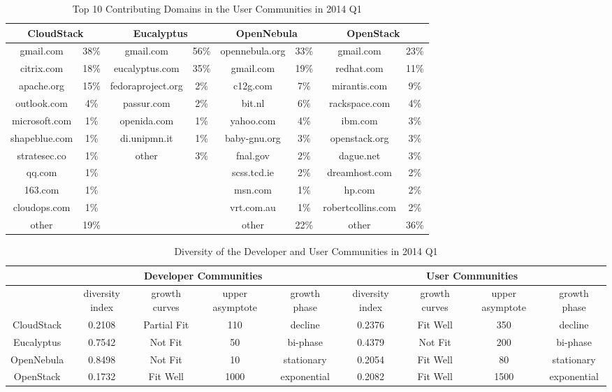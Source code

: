 \documentclass[conference]{IEEEtran}
\begin{document}
\begin{table}[t!]
\caption{Top 10 Contributing Domains in the User Communities in 2014 Q1}
\label{tbl:user}
\centering
\begin{tabular}{|c|c|c|c|c|c|c|c|} \hline
    \multicolumn{2}{|c|}{CloudStack} &
    \multicolumn{2}{|c|}{Eucalyptus} &
    \multicolumn{2}{|c|}{OpenNebula} &
    \multicolumn{2}{|c|}{OpenStack} \\ \hline
    gmail.com & 38\% & gmail.com & 56\% & opennebula.org & 33\% & gmail.com & 23\% \\ \hline
    citrix.com & 18\% & eucalyptus.com & 35\% & gmail.com & 19\% & redhat.com & 11\% \\ \hline
	apache.org & 15\% & fedoraproject.org & 2\% & c12g.com& 7\% & mirantis.com & 9\% \\ \hline
	outlook.com & 4\% & passur.com & 2\% & bit.nl & 6\% & rackspace.com & 4\% \\ \hline
	microsoft.com & 1\% & openida.com & 1\% & yahoo.com & 4\% & ibm.com & 3\% \\ \hline
	shapeblue.com & 1\% &di.unipmn.it & 1\% & baby-gnu.org& 3\% & openstack.org & 3\% \\ \hline
	stratesec.co & 1\% & other & 3\% & fnal.gov& 2\% & dague.net & 3\% \\ \hline
	qq.com & 1\% & & & scss.tcd.ie& 2\% & dreamhost.com & 2\% \\ \hline
	163.com & 1\% & & & msn.com& 1\% & hp.com & 2\% \\ \hline
	cloudops.com & 1\% & & & vrt.com.au& 1\% & robertcollins.com & 2\% \\ \hline
	other & 19\% & & & other& 22\% & other &36\% \\ \hline
\end{tabular}
\end{table}


\begin{table}[t!]
\caption{Diversity of the Developer and User Communities in 2014 Q1}
\label{tbl:diversity}
\centering
\begin{tabular}{|c|c|c|c|c|c|c|c|c|} \hline
    \multicolumn{1}{|c|}{} &
    \multicolumn{4}{|c|}{Developer Communities} &
    \multicolumn{4}{|c|}{User Communities} \\ \hline
	  & diversity index & growth curves & upper asymptote & growth phase & diversity index & growth curves & upper asymptote & growth phase \\ \hline
	 CloudStack & 0.2108 & Partial Fit & 110 & decline & 0.2376 & Fit Well & 350 & decline \\ \hline
	 Eucalyptus & 0.7542 & Not Fit & 50 & bi-phase & 0.4379 & Not Fit & 200 & bi-phase \\ \hline
	 OpenNebula & 0.8498 & Not Fit & 10 & stationary & 0.2054 & Fit Well & 80 & stationary \\ \hline
	 OpenStack  & 0.1732 & Fit Well & 1000 & exponential & 0.2082 & Fit Well & 1500 & exponential \\ \hline
\end{tabular}
\end{table}
\end{document}
